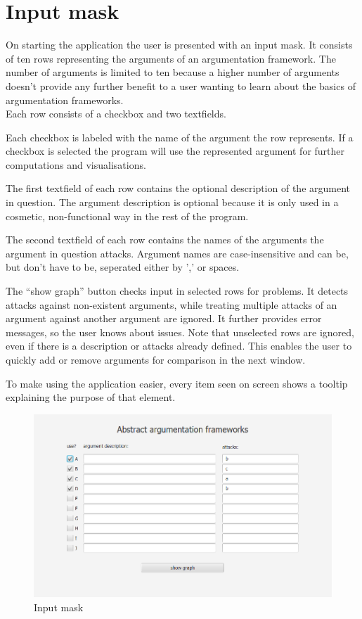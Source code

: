 \documentclass[draft,final]{vutinfth} %
\newcommand{\hl}{\par\medskip}
\begin{document}
\section{Input mask}
On starting the application the user is presented with an input mask. It consists of ten rows representing the arguments of an argumentation framework. The number of arguments is limited to ten because a higher number of arguments doesn't provide any further benefit to a user wanting to learn about the basics of argumentation frameworks.\\
Each row consists of a checkbox and two textfields.\hl
Each checkbox is labeled with the name of the argument the row represents. If a checkbox is selected the program will use the represented argument for further computations and visualisations.\hl
The first textfield of each row contains the optional description of the argument in question. The argument description is optional because it is only used in a cosmetic, non-functional way in the rest of the program.\hl
The second textfield of each row contains the names of the arguments the argument in question attacks. Argument names are case-insensitive and can be, but don't have to be, seperated either by ',' or spaces.\hl
The ``show graph'' button checks input in selected rows for problems. It detects attacks against non-existent arguments, while treating multiple attacks of an argument against another argument are ignored. It further provides error messages, so the user knows about issues. Note that unselected rows are ignored, even if there is a description or attacks already defined. This enables the user to quickly add or remove arguments for comparison in the next window.\hl
To make using the application easier, every item seen on screen shows a tooltip explaining the purpose of that element.

\FloatBarrier
	\begin{figure}[!htb]
		\centering
		\includegraphics[width=\linewidth]{pics/input.png}
		\caption{Input mask}
	\end{figure}
\FloatBarrier
\end{document}
